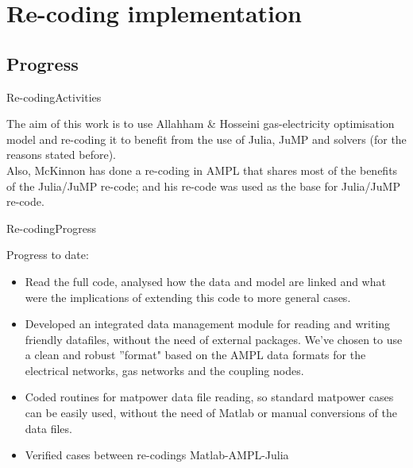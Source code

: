 \documentclass[handout]{beamer}
\begin{document}
\section{Re-coding implementation}

\subsection{Progress}
\begin{frame}[t]{Re-coding}{Activities}

The aim of this work is to use Allahham \& Hosseini gas-electricity optimisation model and re-coding it to benefit from the use of Julia, JuMP and solvers (for the reasons stated before). \\[12pt]

Also, McKinnon has done a re-coding in AMPL that shares most of the benefits of the Julia/JuMP re-code; and his re-code was used as the base for Julia/JuMP re-code.

\end{frame}

\begin{frame}[t]{Re-coding}{Progress}

Progress to date:
\begin{itemize}
  \item Read the full code, analysed how the data and model are linked and what were the implications of extending this code to more general cases.
  \item Developed an integrated data management module for reading and writing friendly datafiles, without the need of external packages. We've chosen to use a clean and robust ''format" based on the AMPL data formats for the electrical networks, gas networks and the coupling nodes.
  \item Coded routines for matpower data file reading, so standard matpower cases can be easily used, without the need of Matlab or manual conversions of the data files.
  \item Verified cases between re-codings Matlab-AMPL-Julia
\end{itemize}

\end{frame}
\end{document}
